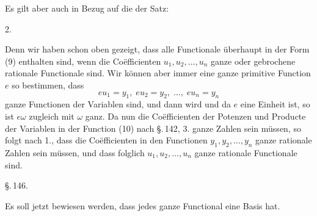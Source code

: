 Es gilt aber auch in Bezug auf die  der Satz:

2. 

Denn wir haben schon oben gezeigt, dass alle Functionale überhaupt in der Form (9) enthalten sind, wenn die Coëfficienten $u_1, u_2, \ldots, u_n$ ganze oder gebrochene rationale Functionale sind. Wir können aber immer eine ganze primitive Function $e$ so bestimmen, dass
\[
e u_1 = y_1, \; e u_2 = y_2, \; \ldots, \; e u_n = y_n
\]
ganze Functionen der Variablen sind, und dann wird
und da $e$ eine Einheit ist, so ist $e\omega$ zugleich mit $\omega$ ganz. Da nun die Coëfficienten der Potenzen und Producte der Variablen in der Function (10) nach \S.\,142, 3. ganze Zahlen sein müssen, so folgt nach 1., dass die Coëfficienten in den Functionen $y_1, y_2, \ldots, y_n$ ganze rationale Zahlen sein müssen, und dass folglich $u_1, u_2, \ldots, u_n$ ganze rationale Functionale sind.

\begin{center}
\S.\,146.

\end{center}


Es soll jetzt bewiesen werden, dass jedes ganze Functional eine Basis hat.
